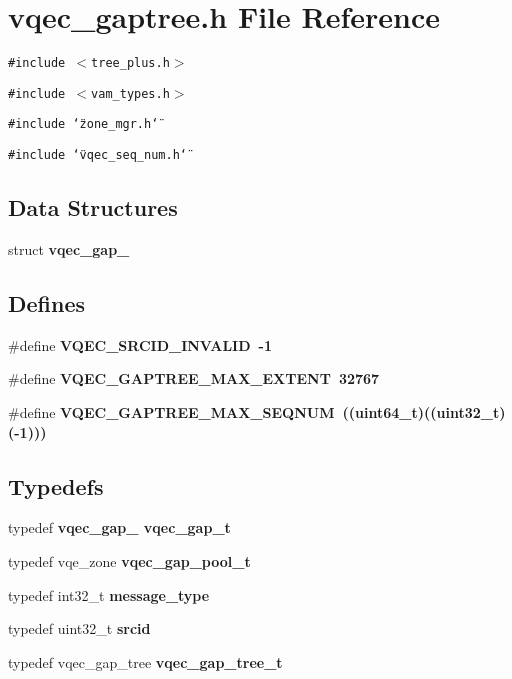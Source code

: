 \section{vqec\_\-gaptree.h File Reference}
\label{vqec__gaptree_8h}
{\tt \#include $<$tree\_\-plus.h$>$}\par
{\tt \#include $<$vam\_\-types.h$>$}\par
{\tt \#include \char`\"{}zone\_\-mgr.h\char`\"{}}\par
{\tt \#include \char`\"{}vqec\_\-seq\_\-num.h\char`\"{}}\par
\subsection*{Data Structures}
\begin{CompactItemize}
\item 
struct \bf{vqec\_\-gap\_\-}
\end{CompactItemize}
\subsection*{Defines}
\begin{CompactItemize}
\item 
\#define \bf{VQEC\_\-SRCID\_\-INVALID}~-1
\item 
\#define \bf{VQEC\_\-GAPTREE\_\-MAX\_\-EXTENT}~32767
\item 
\#define \bf{VQEC\_\-GAPTREE\_\-MAX\_\-SEQNUM}~((uint64\_\-t)((uint32\_\-t)(-1)))
\end{CompactItemize}
\subsection*{Typedefs}
\begin{CompactItemize}
\item 
typedef \bf{vqec\_\-gap\_\-} \bf{vqec\_\-gap\_\-t}
\item 
typedef vqe\_\-zone \bf{vqec\_\-gap\_\-pool\_\-t}
\item 
typedef int32\_\-t \bf{message\_\-type}
\item 
typedef uint32\_\-t \bf{srcid}
\item 
typedef vqec\_\-gap\_\-tree \bf{vqec\_\-gap\_\-tree\_\-t}
\end{CompactItemize}
